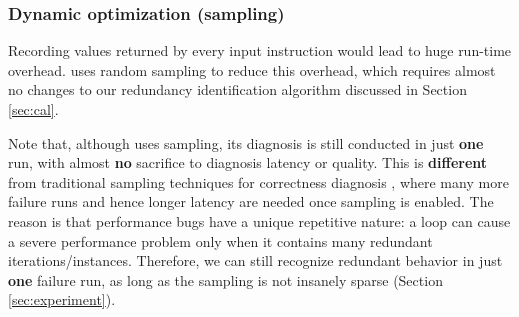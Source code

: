 \subsubsection{Dynamic optimization (sampling)}
\label{sec:inst}


Recording values returned by every input instruction would lead to 
huge run-time overhead.
\Tool uses random sampling to reduce this overhead, which 
requires almost no changes to our redundancy 
identification algorithm discussed in Section \ref{sec:cal}.

Note that, although \Tool uses sampling, its diagnosis is still conducted
in just \textbf{one} run, with almost \textbf{no}
sacrifice to diagnosis latency or quality. This is
\textbf{different} from traditional sampling techniques
for correctness diagnosis \cite{liblit03,liblit05}, where
many more failure runs and hence longer latency
are needed once sampling is enabled.
The reason is that performance bugs have a unique repetitive nature:
a loop can cause a severe performance problem only when it 
contains many redundant iterations/instances.
Therefore, we can still recognize redundant behavior in just
\textbf{one} failure run, 
as long as the sampling is not insanely sparse
(Section \ref{sec:experiment}). 



